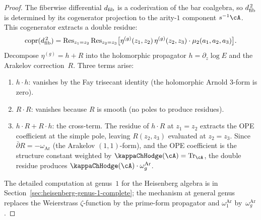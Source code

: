\begin{proof}
The fiberwise differential $d_{\mathrm{fib}}$ is a coderivation of the bar coalgebra, so $d_{\mathrm{fib}}^{\,2}$ is determined by its cogenerator projection to the arity-$1$ component $s^{-1}\cA$. This cogenerator extracts a double residue:
\[
\mathrm{copr}(d_{\mathrm{fib}}^{\,2})
= \operatorname{Res}_{z_1 = z_2}\operatorname{Res}_{z_2 = z_3}
\bigl[\eta^{(g)}(z_1, z_2)\,\eta^{(g)}(z_2, z_3) \cdot \mu_2(a_1, a_2, a_3)\bigr].
\]
Decompose $\eta^{(g)} = h + R$ into the holomorphic propagator $h = \partial_z \log E$ and the Arakelov correction~$R$. Three terms arise:
\begin{enumerate}[label=\textup{(\alph*)}]
\item $h \cdot h$: vanishes by the Fay trisecant identity (the holomorphic Arnold $3$-form is zero).
\item $R \cdot R$: vanishes because $R$ is smooth (no poles to produce residues).
\item $h \cdot R + R \cdot h$: the cross-term. The residue of $h \cdot R$ at $z_1 = z_2$ extracts the OPE coefficient at the simple pole, leaving $R(z_2, z_3)$ evaluated at $z_2 = z_3$. Since $\bar\partial R = -\omega_{\mathrm{Ar}}$ (the Arakelov $(1,1)$-form), and the OPE coefficient is the structure constant weighted by $\kappaChHodge(\cA) = \mathrm{Tr}_\cA$, the double residue produces $\kappaChHodge(\cA) \cdot \omega_g^{\mathrm{Ar}}$.
\end{enumerate}
The detailed computation at genus~$1$ for the Heisenberg algebra is in Section~\textup{\ref{sec:heisenberg-genus-1-complete}}; the mechanism at general genus replaces the Weierstrass $\zeta$-function by the prime-form propagator and $\omega_1^{\mathrm{Ar}}$ by~$\omega_g^{\mathrm{Ar}}$.
\end{proof}

